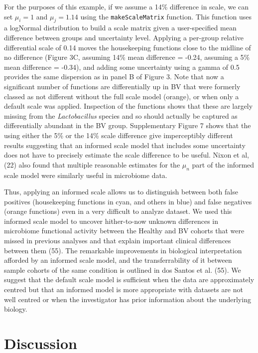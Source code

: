 \documentclass[
]{article}
\begin{document}
For the purposes of this example, if we assume a 14\% difference in
scale, we can set \(\mu_i = 1\) and \(\mu_j = 1.14\) using the
\texttt{makeScaleMatrix} function. This function uses a logNormal
distribution to build a scale matrix given a user-specified mean
difference between groups and uncertainty level. Applying a per-group
relative differential scale of 0.14 moves the housekeeping functions
close to the midline of no difference (Figure 3C, assuming 14\% mean
difference = -0.24, assuming a 5\% mean difference = -0.34), and adding
some uncertainty using a gamma of 0.5 provides the same dispersion as in
panel B of Figure 3. Note that now a significant number of functions are
differentially up in BV that were formerly classed as not different
without the full scale model (orange), or when only a default scale was
applied. Inspection of the functions shows that these are largely
missing from the \emph{Lactobacillus} species and so should actually be
captured as differentially abundant in the BV group. Supplementary
Figure 7 shows that the using either the 5\% or the 14\% scale
difference give imperceptibly different results suggesting that an
informed scale model that includes some uncertainty does not have to
precisely estimate the scale difference to be useful. Nixon et al, (22)
also found that multiple reasonable estimates for the \(\mu_n\) part of
the informed scale model were similarly useful in microbiome data.

Thus, applying an informed scale allows us to distinguish between both
false positives (housekeeping functions in cyan, and others in blue) and
false negatives (orange functions) even in a very difficult to analyze
dataset. We used this informed scale model to uncover hither-to-now
unknown differences in microbiome functional activity between the
Healthy and BV cohorts that were missed in previous analyses and that
explain important clinical differences between them (55). The remarkable
improvements in biological interpretation afforded by an informed scale
model, and the transferrability of it between sample cohorts of the same
condition is outlined in dos Santos et al. (55). We suggest that the
default scale model is sufficient when the data are approximately
centred but that an informed model is more appropriate with datasets are
not well centred or when the investigator has prior information about
the underlying biology.

\section{Discussion}\label{discussion}
\end{document}
